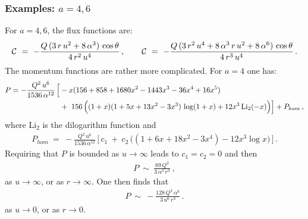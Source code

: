 \documentclass[11pt]{article}
\def\cC{{\cal C}}
\numberwithin{equation}{section}
\begin{document}
\subsubsection{Examples: $a = 4, 6$}
\label{ss:example2} 
For $a =4, 6$, the flux functions are: 
% 
\begin{equation}
\cC ~=~   - \frac{Q \,(3\,   r\, u^2 + 8 \,\alpha^3)\,  \cos \theta  }{4\, r^2\, u^4 }  \,, \qquad \cC ~=~ - \frac{Q \,(3\,   r^2\, u^4 + 8 \,\alpha^3\, r\,u^2 + 8 \,\alpha^6)\,  \cos \theta  }{4\, r^3\, u^4 }\,.
 \label{C3part4}
\end{equation}
%
The momentum functions are rather more complicated.  For $a=4$ one has:
%
\begin{equation}
\begin{aligned}
P  = -\frac{Q^2\, u^6}{1536 \,\alpha^{12}} \,\Big[& -x( 156 +858  +1680 x^2 -1443 x^3 -36  x^4 + 16 x^5 ) \\
&+~156\,\Big((1+x)  (1 +5 x + 13 x^2-3 x^3 ) \, \log (1+x) + 12 x^3 \, {\rm Li}_2 (-x)  \Big) \Big] + P_{hom} \,,
\end{aligned}
\label{Ppart4}
\end{equation}
%
where Li$_2$ is the dilogarithm function and 
%
\begin{equation}
\begin{aligned}
P_{hom}   ~=~ -\frac{Q^2\, u^6}{1536 \,\alpha^{12}} \, \Big[\, c_1 ~+~ c_2 \, \big( (1 + 6x +18 x^2 -3 x^4) -12 x^3 \log x \big) \,  \Big]   \,.
\end{aligned}
\label{Phom4}
\end{equation}
%
Requiring that $P$ is bounded as $u \to \infty$ leads to $c_1 =c_2 =0$ and then 
%
\begin{equation}
\begin{aligned}
P   ~\sim~  \frac{89\, Q^2}{3 \,\alpha^{3} \, r^3 }  \,,
\end{aligned}
\label{Pasymp4}
\end{equation}
%
as $u \to \infty$, or as $r \to \infty$.   One then finds that 
%
\begin{equation}
\begin{aligned}
P   ~\sim~  -\frac{128\, Q^2 \, \alpha^{6}}{3 \, u^6 \, r^3 }  \,.
\end{aligned}
\label{Pasymp4a}
\end{equation}
%
as $u \to 0$, or as $r \to 0$.
\end{document}
